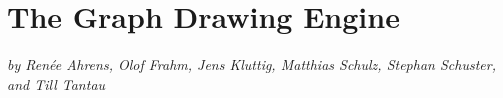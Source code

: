 %
%
%

\section{The Graph Drawing Engine}

\emph{by Ren\'ee Ahrens, Olof Frahm, Jens Kluttig, Matthias Schulz,
  Stephan Schuster, and Till Tantau}

\label{section-base-graphdrawing}


\ifluatex\relax{}\expandafter\endinput\fi

\subsection{Overview}

This chapter explains in detail how the graph drawing engine works. As
explained in Section~\ref{section-library-graphdrawing}, the graph
drawing engine provides a connection between the syntax of \tikzname\
and \pgfname for specifying graphs and code written in the Lua
programming language for computing layouts. The present section will
discuss this process in detail.

TT: To be written...


\subsection{Graph Drawing Scopes}

\subsection{Graph Parameters}

\subsection{Lua Layer: Overview}

\subsection{Lua Layer: Implementing Graph Drawing Algorithms}

